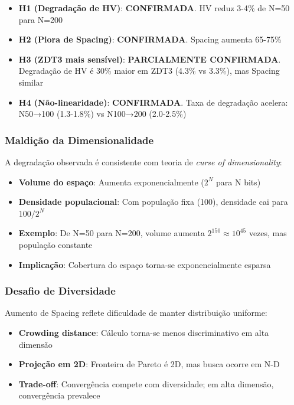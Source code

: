 \begin{itemize}
    \item \textbf{H1 (Degradação de HV)}: \textbf{CONFIRMADA}. HV reduz 3-4\% de N=50 para N=200
    \item \textbf{H2 (Piora de Spacing)}: \textbf{CONFIRMADA}. Spacing aumenta 65-75\%
    \item \textbf{H3 (ZDT3 mais sensível)}: \textbf{PARCIALMENTE CONFIRMADA}. Degradação de HV é 30\% maior em ZDT3 (4.3\% vs 3.3\%), mas Spacing similar
    \item \textbf{H4 (Não-linearidade)}: \textbf{CONFIRMADA}. Taxa de degradação acelera: N50→100 (1.3-1.8\%) vs N100→200 (2.0-2.5\%)
\end{itemize}

\subsubsection{Maldição da Dimensionalidade}

A degradação observada é consistente com teoria de \textit{curse of dimensionality}:

\begin{itemize}
    \item \textbf{Volume do espaço}: Aumenta exponencialmente ($2^N$ para N bits)
    \item \textbf{Densidade populacional}: Com população fixa (100), densidade cai para $100/2^N$
    \item \textbf{Exemplo}: De N=50 para N=200, volume aumenta $2^{150} \approx 10^{45}$ vezes, mas população constante
    \item \textbf{Implicação}: Cobertura do espaço torna-se exponencialmente esparsa
\end{itemize}

\subsubsection{Desafio de Diversidade}

Aumento de Spacing reflete dificuldade de manter distribuição uniforme:

\begin{itemize}
    \item \textbf{Crowding distance}: Cálculo torna-se menos discriminativo em alta dimensão
    \item \textbf{Projeção em 2D}: Fronteira de Pareto é 2D, mas busca ocorre em N-D
    \item \textbf{Trade-off}: Convergência compete com diversidade; em alta dimensão, convergência prevalece
\end{itemize}

